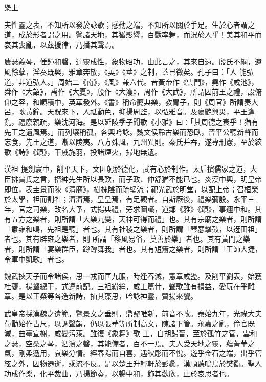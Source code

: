 
\begin{pinyinscope}

 樂上



 夫性靈之表，不知所以發於詠歌；感動之端，不知所以關於手足。生於心者謂之道，成於形者謂之用。譬諸天地，其猶影響，百獸率舞，而況於人乎！美其和平而哀其喪亂，以茲援律，乃播其聲焉。



 農瑟羲琴，倕鐘和磬，達靈成性，象物昭功，由此言之，其來自遠。殷氏不綱，遺風餘孽，淫奏既興，雅章奔散，《英》《莖》之制，蓋已微矣。孔子曰：「人
 能弘道，非道弘人。」周始二《南》，《風》兼六代。昔黃帝作《雲門》，堯作《咸池》，舜作《大韶》，禹作《大夏》，殷作《大濩》，周作《大武》，所謂因前王之禮，設俯仰之容，和順積中，英華發外。《書》稱命夔典樂，教胄子，則《周官》所謂奏大呂，歌黃鐘。天貺來下，人祗動色，抑揚周監，以弘雅音。及褒艷興災，平王逢亂，禮廢親疏，樂沈河海。是以延陵季子聞歌《小雅》曰：「其周德之衰乎！猶有先王之遺風焉。」而列壤稱孤，各興吟詠。魏文侯聆古樂而恐臥，晉平公聽新聲而忘食，先王之道，漸以陵夷。八方殊風，九州異則。秦氏并吞，遂專刑憲，至於絃歌《詩》《頌》，干戚旄羽，投諸煙火，掃地無遺。



 漢祖
 提劍寰中，削平天下，文匪躬於德化，武有心於制作。太后擯儒家之道，大臣排賈氏之言，搢紳先生所以長歎，而子政、仲舒猶不能已也。炎漢中興，明皇帝即位，表圭景而陳《清廟》，樹槐陰而疏璧流；祀光武於明堂，以配上帝；召桓榮於太學，袒而割牲；濟濟焉，皇皇焉，有足觀者。自斯厥後，禮樂彌殷。永平三年，官之司樂，改名大予，式揚典禮，旁求圖讖，道鄰《雅》《頌》，事邇中和。其有五方之樂者，則所謂「大樂九變，天神可得而禮」也。其有宗廟之樂者，則所謂「肅雍和鳴，先祖是聽」者也。其有社稷之樂者，則所謂「琴瑟擊鼓，以迓田祖」者也。其有辟雍之樂者，則
 所謂「移風易俗，莫善於樂」者也。其有黃門之樂者，則所謂「宴樂群臣，蹲蹲舞我」者也。其有短簫之樂者，則所謂「王師大捷，令軍中凱歌」者也。



 魏武挾天子而令諸侯，思一戎而匡九服，時逢吞滅，憲章咸盪。及削平劉表，始獲杜夔，揚鼙總干，式遵前記。三祖紛綸，咸工篇什，聲歌雖有損益，愛玩在乎雕章。是以王粲等各造新詩，抽其藻思，吟詠神靈，贊揚來饗。



 武皇帝採漢魏之遺範，覽景文之垂則，鼎鼐唯新，前音不改。泰始九年，光祿大夫荀勖始作古尺，以調聲韻，仍以張華等所制高文，陳諸下管。永嘉之亂，伶官既減，曲臺宣榭，咸變污萊。雖復《象舞》歌
 工，自胡歸晉，至於孤竹之管，雲和之瑟，空桑之琴，泗濱之磬，其能備者，百不一焉。夫人受天地之靈，蘊菁華之氣，剛柔遞用，哀樂分情。經春陽而自喜，遇秋彫而不悅。遊乎金石之端，出乎管絃之外，因物遷逝，乘流不反。是以楚王升輕軒於彭蠡，漢順聽鳴鳥於樊衢。聖人功成作樂，化平裁曲，乃揚節奏，以暢中和，飾其歡欣，止於哀思者也。




\end{pinyinscope}
